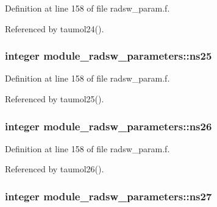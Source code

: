 Definition at line 158 of file radsw\+\_\+param.\+f.



Referenced by taumol24().

\subsubsection[{\texorpdfstring{ns25}{ns25}}]{\setlength{\rightskip}{0pt plus 5cm}integer module\+\_\+radsw\+\_\+parameters\+::ns25}\hypertarget{namespacemodule__radsw__parameters_abaf12fd8281745e299a942530cef1a97}{}\label{namespacemodule__radsw__parameters_abaf12fd8281745e299a942530cef1a97}


Definition at line 158 of file radsw\+\_\+param.\+f.



Referenced by taumol25().

\subsubsection[{\texorpdfstring{ns26}{ns26}}]{\setlength{\rightskip}{0pt plus 5cm}integer module\+\_\+radsw\+\_\+parameters\+::ns26}\hypertarget{namespacemodule__radsw__parameters_a3cf6dd031ffa5545db46bb1b54fe42b6}{}\label{namespacemodule__radsw__parameters_a3cf6dd031ffa5545db46bb1b54fe42b6}


Definition at line 158 of file radsw\+\_\+param.\+f.



Referenced by taumol26().

\subsubsection[{\texorpdfstring{ns27}{ns27}}]{\setlength{\rightskip}{0pt plus 5cm}integer module\+\_\+radsw\+\_\+parameters\+::ns27}\hypertarget{namespacemodule__radsw__parameters_a801c6d2223877ddf3f633dc7ffcd528b}{}\label{namespacemodule__radsw__parameters_a801c6d2223877ddf3f633dc7ffcd528b}


